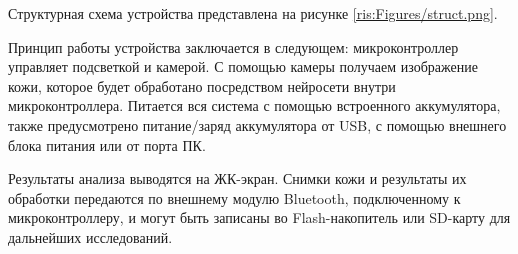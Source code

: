 \begin{sloppypar}


Структурная схема устройства представлена на рисунке \ref{ris:Figures/struct.png}.


Принцип работы устройства заключается в следующем: микроконтроллер управляет подсветкой и камерой. С помощью камеры получаем изображение кожи, которое будет обработано посредством нейросети внутри микроконтроллера. Питается вся система с помощью встроенного аккумулятора, также предусмотрено питание/заряд аккумулятора от USB, с помощью внешнего блока питания или от порта ПК. 

Результаты анализа выводятся на ЖК-экран. Снимки кожи и результаты их обработки передаются по внешнему модулю Bluetooth, подключенному к микроконтроллеру, и могут быть записаны во Flash-накопитель или SD-карту для дальнейших исследований.


\end{sloppypar}
